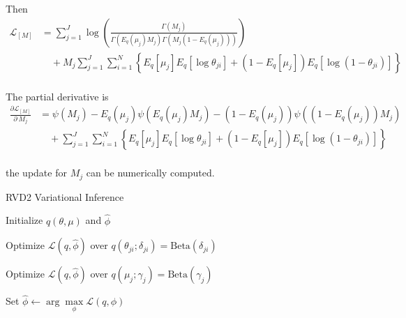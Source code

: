 \documentclass[11pt,reqno]{amsart}
\begin{document}
Then
\begin{equation}
\begin{split}
\label{M}
\mathcal{L}_{{[M]}} 
&= \sum_{j=1}^{J} \log\left( \frac{\Gamma(M_j)}{\Gamma(E_q(\mu_j) M_j) \Gamma(M_j (1-E_q(\mu_j) ))}\right) \\ 
&\quad + M_j \sum_{j=1}^{J} \sum_{i=1}^{N} \left\lbrace E_q \left[ \mu_j \right] E_q \left[ \log \theta_{ji} \right] + \left( 1 - E_q\left[ \mu_j \right]  \right) E_q\left[ \log \left( 1 - \theta_{ji}\right) \right] \right\rbrace \\
\end{split}
\end{equation}

The partial derivative is
\begin{equation}
\begin{split}
\frac{\partial \mathcal{L}_{{[M]}} }{\partial \ M_j} 
&= \psi(M_j) - E_q(\mu_j) \psi(E_q(\mu_j) M_j)
- (1-E_q(\mu_j)) \psi((1-E_q(\mu_j)) M_j) \\
&\quad + \sum_{j=1}^{J} \sum_{i=1}^{N} \left\lbrace E_q \left[ \mu_j \right] E_q \left[ \log \theta_{ji} \right] 
+ \left( 1 - E_q\left[ \mu_j \right]  \right) E_q\left[ \log \left( 1 - \theta_{ji}\right) \right] \right\rbrace \\
\end{split}
\end{equation}

the update for $ M_j $ can be numerically computed.

\begin{algorithm}[ht]
  \caption{RVD2 Variational Inference}
  \label{alg:rvd2_vi}
  \begin{algorithmic}[1]

  \State Initialize $ q(\theta, \mu) $ and $\hat{\phi}$

  \Repeat
  
	\Repeat
	
			\State Optimize $\mathcal{L}(q, \hat{\phi})$ over $q(\theta_{ji}; \delta_{ji}) = \text{Beta} (\delta_{ji})$				
			\EndFor			
		\EndFor
		
	
			\State Optimize $\mathcal{L}(q, \hat{\phi})$ over $q(\mu_j; \gamma_j) = \text{Beta} (\gamma_j)$			                  
		\EndFor
	

  \State Set $\hat{\phi} \leftarrow \arg \max\limits_{\phi}
            \mathcal{L}(q,\phi)$

  \end{algorithmic}
  
\end{algorithm}




\appendix

%
%
\end{document}
